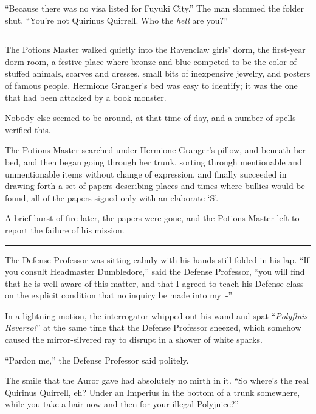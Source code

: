 ``Because there was no visa listed for Fuyuki City.'' The man slammed the folder shut. ``You're not Quirinus Quirrell. Who the \emph{hell} are you?''

\begin{center}\rule{3in}{0.4pt}\end{center}

The Potions Master walked quietly into the Ravenclaw girls' dorm, the first-year dorm room, a festive place where bronze and blue competed to be the color of stuffed animals, scarves and dresses, small bits of inexpensive jewelry, and posters of famous people. Hermione Granger's bed was easy to identify; it was the one that had been attacked by a book monster.

Nobody else seemed to be around, at that time of day, and a number of spells verified this.

The Potions Master searched under Hermione Granger's pillow, and beneath her bed, and then began going through her trunk, sorting through mentionable and unmentionable items without change of expression, and finally succeeded in drawing forth a set of papers describing places and times where bullies would be found, all of the papers signed only with an elaborate `S'.

A brief burst of fire later, the papers were gone, and the Potions Master left to report the failure of his mission.

\begin{center}\rule{3in}{0.4pt}\end{center}

The Defense Professor was sitting calmly with his hands still folded in his lap. ``If you consult Headmaster Dumbledore,'' said the Defense Professor, ``you will find that he is well aware of this matter, and that I agreed to teach his Defense class on the explicit condition that no inquiry be made into my~-''

In a lightning motion, the interrogator whipped out his wand and spat ``\emph{Polyfluis Reverso!}'' at the same time that the Defense Professor sneezed, which somehow caused the mirror-silvered ray to disrupt in a shower of white sparks.

``Pardon me,'' the Defense Professor said politely.

The smile that the Auror gave had absolutely no mirth in it. ``So where's the real Quirinus Quirrell, eh? Under an Imperius in the bottom of a trunk somewhere, while you take a hair now and then for your illegal Polyjuice?''

